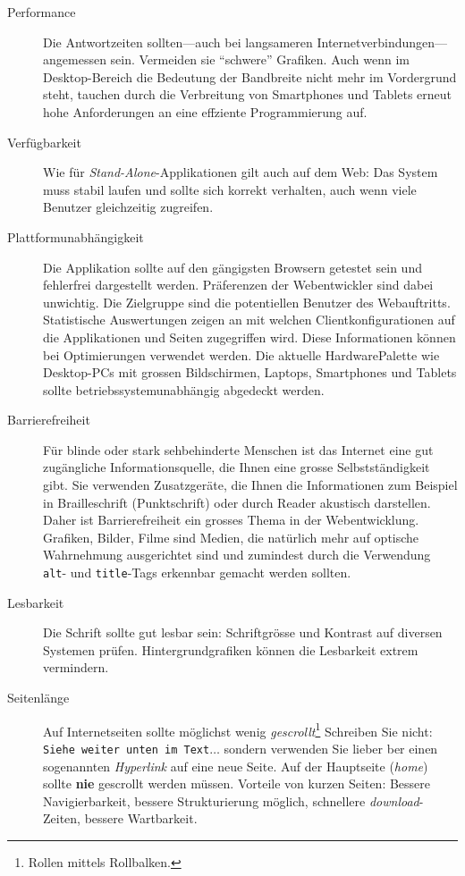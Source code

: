 \begin{description}
    \item[Performance] Die Antwortzeiten sollten---auch bei langsameren
    Internetverbindungen---angemessen sein. Vermeiden sie ``schwere'' Grafiken.
    Auch wenn im Desktop-Bereich die Bedeutung der Bandbreite nicht mehr im
    Vordergrund steht, tauchen durch die Verbreitung von Smartphones und Tablets
    erneut hohe Anforderungen an eine effziente Programmierung auf.

    \item[Verfügbarkeit] Wie für \emph{Stand-Alone}-Applikationen gilt auch auf dem
    Web: Das System muss stabil laufen und sollte sich korrekt verhalten, auch
    wenn viele Benutzer gleichzeitig zugreifen.

    \item[Plattformunabhängigkeit] Die Applikation sollte auf den gängigsten
    Browsern getestet sein und fehlerfrei dargestellt werden. Präferenzen der
    Webentwickler sind dabei unwichtig. Die Zielgruppe sind die potentiellen
    Benutzer des Webauftritts. Statistische Auswertungen zeigen an mit welchen
    Clientkonfigurationen auf die Applikationen und Seiten zugegriffen wird.
    Diese Informationen können bei Optimierungen verwendet werden. Die aktuelle
    HardwarePalette wie Desktop-PCs mit grossen Bildschirmen, Laptops,
    Smartphones und Tablets sollte betriebssystemunabhängig abgedeckt werden.

    \item[Barrierefreiheit] Für blinde oder stark sehbehinderte Menschen ist
    das Internet eine gut zugängliche Informationsquelle, die Ihnen eine
    grosse Selbstständigkeit gibt. Sie verwenden Zusatzgeräte, die Ihnen die
    Informationen zum Beispiel in Brailleschrift (Punktschrift) oder durch
    Reader akustisch darstellen. Daher ist Barrierefreiheit ein grosses Thema
    in der Webentwicklung. Grafiken, Bilder, Filme sind Medien, die natürlich
    mehr auf optische Wahrnehmung ausgerichtet sind und zumindest durch die
    Verwendung \texttt{alt}- und \texttt{title}-Tags erkennbar gemacht werden sollten.

    \item[Lesbarkeit] Die Schrift sollte gut lesbar sein: Schriftgrösse und
    Kontrast auf diversen Systemen prüfen. Hintergrundgrafiken können die
    Lesbarkeit extrem vermindern.

    \item[Seitenlänge] Auf Internetseiten sollte möglichst wenig
    \emph{gescrollt}\footnote{Rollen mittels Rollbalken.} Schreiben Sie nicht:
    \texttt{Siehe weiter unten im Text}$\ldots$ sondern verwenden Sie
    lieber ber einen sogenannten \emph{Hyperlink} auf eine neue Seite. Auf der
    Hauptseite (\emph{home}) sollte \textbf{nie} gescrollt werden müssen. Vorteile von
    kurzen Seiten: Bessere Navigierbarkeit, bessere Strukturierung möglich,
    schnellere \emph{download}-Zeiten, bessere Wartbarkeit.


\end{description}
